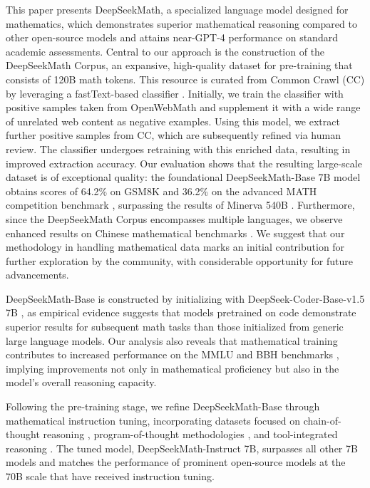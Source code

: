 This paper presents DeepSeekMath, a specialized language model designed for mathematics, which demonstrates superior mathematical reasoning compared to other open-source models and attains near-GPT-4 performance on standard academic assessments. Central to our approach is the construction of the DeepSeekMath Corpus, an expansive, high-quality dataset for pre-training that consists of 120B math tokens. This resource is curated from Common Crawl (CC) by leveraging a fastText-based classifier \citep{joulin2016fasttext}. Initially, we train the classifier with positive samples taken from OpenWebMath \citep{openwebmath} and supplement it with a wide range of unrelated web content as negative examples. Using this model, we extract further positive samples from CC, which are subsequently refined via human review. The classifier undergoes retraining with this enriched data, resulting in improved extraction accuracy. Our evaluation shows that the resulting large-scale dataset is of exceptional quality: the foundational DeepSeekMath-Base 7B model obtains scores of 64.2\% on GSM8K \citep{gsm8k} and 36.2\% on the advanced MATH competition benchmark \citep{MATH}, surpassing the results of Minerva 540B \citep{minerva}. Furthermore, since the DeepSeekMath Corpus encompasses multiple languages, we observe enhanced results on Chinese mathematical benchmarks \citep{wei2023cmath,agieval}. We suggest that our methodology in handling mathematical data marks an initial contribution for further exploration by the community, with considerable opportunity for future advancements.

DeepSeekMath-Base is constructed by initializing with DeepSeek-Coder-Base-v1.5 7B \citep{deepseek-coder}, as empirical evidence suggests that models pretrained on code demonstrate superior results for subsequent math tasks than those initialized from generic large language models. Our analysis also reveals that mathematical training contributes to increased performance on the MMLU \citep{mmlu} and BBH benchmarks \citep{bbh}, implying improvements not only in mathematical proficiency but also in the model's overall reasoning capacity.

Following the pre-training stage, we refine DeepSeekMath-Base through mathematical instruction tuning, incorporating datasets focused on chain-of-thought reasoning \citep{cot}, program-of-thought methodologies \citep{pot,pal}, and tool-integrated reasoning \citep{tora}. The tuned model, DeepSeekMath-Instruct 7B, surpasses all other 7B models and matches the performance of prominent open-source models at the 70B scale that have received instruction tuning.

